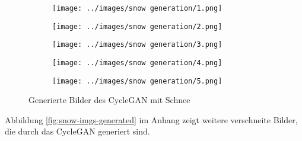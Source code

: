  \begin{figure}[H]
	\centering
  \captionsetup[subfigure]{labelformat=empty}
	\begin{subfigure}[b]{0.15\textwidth}
		 \centering
		 \texttt{[image: ../images/snow generation/1.png]}
	\end{subfigure}
	\hspace{1em}%
	\begin{subfigure}[b]{0.15\textwidth}
		 \centering
		 \texttt{[image: ../images/snow generation/2.png]}
	\end{subfigure}
	\hspace{1em}%
	\begin{subfigure}[b]{0.15\textwidth}
		 \centering
		 \texttt{[image: ../images/snow generation/3.png]}
	\end{subfigure}
	\hspace{1em}%
	\begin{subfigure}[b]{0.15\textwidth}
	 \centering
	 \texttt{[image: ../images/snow generation/4.png]}
	\end{subfigure}
	 \hspace{1em}%
	\begin{subfigure}[b]{0.15\textwidth}
	 \centering
	 \texttt{[image: ../images/snow generation/5.png]}
  \end{subfigure}
 \caption{Generierte Bilder des \ac{CycleGAN} mit Schnee}
 \label{fig:snow-imgs-unet}
 \end{figure}

 Abbildung \ref{fig:snow-imgs-generated} im Anhang zeigt weitere verschneite Bilder, die durch das \ac{CycleGAN} generiert sind.